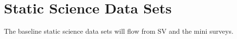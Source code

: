 \section{Static Science Data Sets} 

The baseline static science data sets will flow from SV and the mini surveys.
